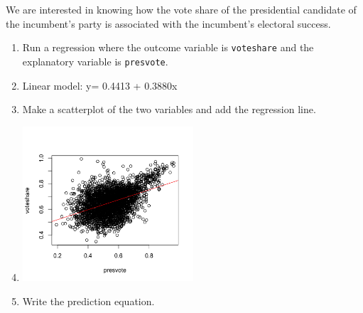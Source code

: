 \documentclass[12pt,letterpaper]{article}
\begin{document}
\noindent We are interested in knowing how the vote share of the presidential candidate of the incumbent's party is associated with the incumbent's electoral success.
	\vspace{.25cm}
	\begin{enumerate}
		\item Run a regression where the outcome variable is \texttt{voteshare} and the explanatory variable is \texttt{presvote}.
			\vspace{0.25cm}
			\item[] Linear model: y= 0.4413 + 0.3880x
			
		\item Make a scatterplot of the two variables and add the regression line. 
			\item[]
			\includegraphics[width=0.5\textwidth]{Q3.png}
			
		\item Write the prediction equation.
	\end{enumerate}
	

\newpage	
\end{document}
